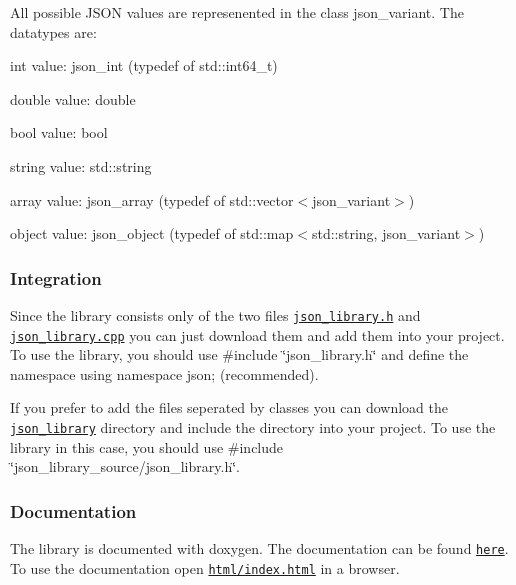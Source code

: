 All possible J\+S\+ON values are represenented in the class {\ttfamily json\+\_\+variant}. The datatypes are\+:
\begin{DoxyItemize}
\item int value\+: {\ttfamily json\+\_\+int} (typedef of {\ttfamily std\+::int64\+\_\+t})
\item double value\+: {\ttfamily double}
\item bool value\+: {\ttfamily bool}
\item string value\+: {\ttfamily std\+::string}
\item array value\+: {\ttfamily json\+\_\+array} (typedef of {\ttfamily std\+::vector$<$json\+\_\+variant$>$})
\item object value\+: {\ttfamily json\+\_\+object} (typedef of {\ttfamily std\+::map$<$std\+::string, json\+\_\+variant$>$})
\end{DoxyItemize}

\subsubsection*{\label{_integration_section}%
Integration}

Since the library consists only of the two files \href{https://github.com/n0dex/cppjsonlib/blob/master/json_library.h}{\tt json\+\_\+library.\+h} and \href{https://github.com/n0dex/cppjsonlib/blob/master/json_library.cpp}{\tt json\+\_\+library.\+cpp} you can just download them and add them into your project. To use the library, you should use {\ttfamily \#include \char`\"{}json\+\_\+library.\+h\char`\"{}} and define the namespace {\ttfamily using namespace json;} (recommended).

If you prefer to add the files seperated by classes you can download the \href{https://github.com/n0dex/cppjsonlib/tree/master/json_library_source}{\tt json\+\_\+library} directory and include the directory into your project. To use the library in this case, you should use {\ttfamily \#include \char`\"{}json\+\_\+library\+\_\+source/json\+\_\+library.\+h\char`\"{}}.

\subsubsection*{\label{_doc_section}%
Documentation}

The library is documented with doxygen. The documentation can be found \href{https://github.com/n0dex/cppjsonlib/tree/master/json_library_documentation}{\tt here}. To use the documentation open \href{https://github.com/n0dex/cppjsonlib/blob/master/json_library_documentation/html/index.html}{\tt html/index.\+html} in a browser.

